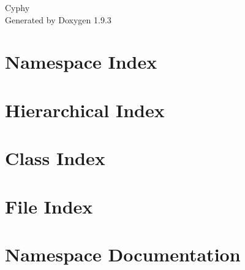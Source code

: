 \documentclass[twoside]{book}
\newcommand{\+}{\discretionary{\mbox{\scriptsize$\hookleftarrow$}}{}{}}
\newcommand{\clearemptydoublepage}{%
    \newpage{\pagestyle{empty}\cleardoublepage}%
  }
\begin{document}
  \raggedbottom
    \hypersetup{pageanchor=false,
                bookmarksnumbered=true,
                pdfencoding=unicode
               }
  \begin{titlepage}
  \vspace*{7cm}
  \begin{center}%
  {\Large Cyphy}\\
  \vspace*{1cm}
  {\large Generated by Doxygen 1.9.3}\\
  \end{center}
  \end{titlepage}
  \clearemptydoublepage
  \tableofcontents
  \clearemptydoublepage
  \hypersetup{pageanchor=true}
\chapter{Namespace Index}

\chapter{Hierarchical Index}

\chapter{Class Index}

\chapter{File Index}

\chapter{Namespace Documentation}




















\end{document}
